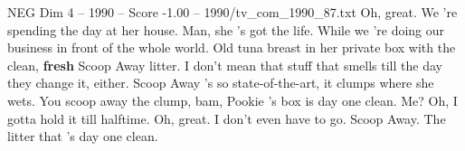 \begin{textsample}{NEG Dim 4 – 1990 – Score -1.00 – 1990/tv\_com\_1990\_87.txt}  \label{ex:f4_neg_078}
Oh, great.
We 're spending the day at her house.
Man, she 's got the life.
While we 're doing our business in front of the whole world.
Old tuna breast in her private box with the clean, \textbf{fresh} Scoop Away litter.
I don't mean that stuff that smells till the day they change it, either.
Scoop Away 's so state-of-the-art, it clumps where she wets.
You scoop away the clump, bam, Pookie 's box is day one clean.
Me?
Oh, I gotta hold it till halftime.
Oh, great.
I don't even have to go.
Scoop Away.
The litter that 's day one clean.

\end{textsample}
